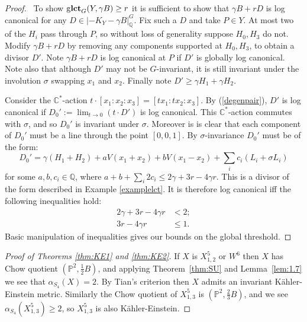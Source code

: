\documentclass{amsart}
\theoremstyle{definition}
\newcommand{\CC}{\mathbb{C}}
\newcommand{\QQ}{\mathbb{Q}}
\newcommand{\ZZ}{\mathbb{Z}}
\newcommand{\PP}{\mathbb{P}}
\DeclareMathOperator{\glct}{g\bf{lct}}
\begin{document}
\begin{proof} \
To show \(\glct_{G}(Y,\gamma B) \ge r\) it is sufficient to show that \(\gamma B + rD\) is log canonical for any \( D \in |-K_Y - \gamma B|_{\QQ}^G\). Fix such a \(D\) and take \(P \in Y\). At most two of the \(H_i\) pass through \(P\), so without loss of generality suppose \(H_0,H_3\) do not. Modify \(\gamma B+r D\) by removing any components supported at \(H_0,H_3\), to obtain a divisor \(D'\). Note \(\gamma B+r D\) is log canonical at \(P\) if \(D'\) is globally log canonical. Note also that although \(D'\) may not be \(G\)-invariant, it is still invariant under the involution \(\sigma \) swapping \(x_1\) and \(x_2\). Finally note \(D' \ge \gamma H_1 + \gamma H_2\).

Consider the \(\CC^*\)-action \(t \cdot [x_1:x_2:x_3] = [ t x_1: t x_2 : x_3]\). By (\ref{degenpair}), \(D'\) is log canonical if \(D_0' := \lim_{t \to 0} \left( t \cdot D' \right) \) is log canonical. This \(\CC^*\)-action commutes with \(\sigma \), and so \(D_0'\) is invariant under \(\sigma\). Moreover is is clear that each component of \(D_0'\) must be a line through the point \([0,0,1]\). By \(\sigma\)-invariance \(D_0'\) must be of the form:
\[
D_0' = \gamma (H_1+H_2) + a V (x_1+x_2) + b V(x_1-x_2) + \sum_i c_i (L_i + \sigma L_i)
\]
for some \(a,b,c_i \in \QQ\), where \(a + b + \sum_i 2 c_i \le 2 \gamma + 3 r - 4 \gamma r\). This is a divisor of the form described in Example \ref{examplelct}. It is therefore log canonical iff the following inequalities hold:
\begin{align*}
2\gamma + 3 r - 4\gamma r &< 2; \\
3 r - 4\gamma r &\le 1.
\end{align*}
Basic manipulation of inequalities gives our bounds on the global threshold.
\end{proof}
\begin{proof}[Proof of Theorems \ref{thm:KE1} and \ref{thm:KE2}]
If \(X\) is \(X_{1,2}^5\) or \(W^6\) then \(X\) has Chow quotient \((\PP^2,\frac{1}{2}B)\), and applying Theorem~\ref{thm:SU} and Lemma~\ref{lem:1.7} we see that \(\alpha_{S_4}(X) = 2\). By Tian's criterion then \(X\) admits an invariant K\"ahler-Einstein metric. Similarly the Chow quotient of \(X_{1,3}^5\) is \((\PP^2,\frac{2}{3}B)\), and we see \(\alpha_{S_4}(X_{1,3}^5) \ge 2\), so \(X_{1,3}^5\) is also K\"ahler-Einstein.
\end{proof}
\end{document}
